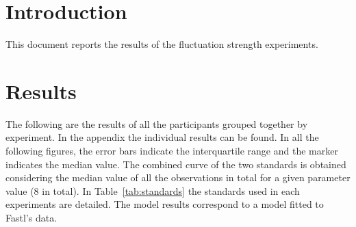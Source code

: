 \documentclass[a4paper]{article}
\begin{document}

\section{Introduction} %
\label{sec:introduction}

This document reports the results of the fluctuation strength experiments.


\section{Results} %
\label{sec:results}

The following are the results of all the participants grouped together by
experiment. In the appendix the individual results can be found. In all the
following figures, the error bars indicate the interquartile range and the
marker indicates the median value. The combined curve of the two standards is
obtained considering the median value of all the observations in total for a
given parameter value (8 in total). In Table~\ref{tab:standards} the standards
used in each experiments are detailed. The model results correspond to a model
fitted to Fastl's data.
\end{document}
